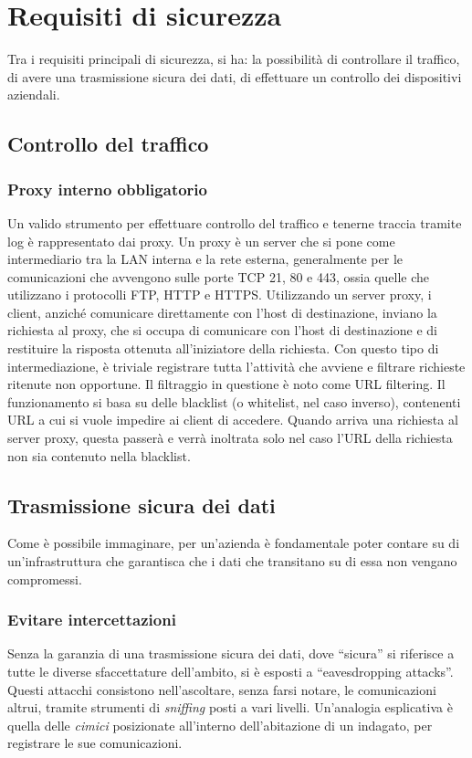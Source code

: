 \section{Requisiti di sicurezza}
Tra i requisiti principali di sicurezza, si ha: la possibilità di controllare il traffico, di avere una trasmissione sicura dei dati, di effettuare un controllo dei dispositivi aziendali.

\subsection{Controllo del traffico}
\subsubsection{Proxy interno obbligatorio}
Un valido strumento per effettuare controllo del traffico e tenerne traccia tramite log è rappresentato dai proxy.
Un proxy è un server che si pone come intermediario tra la LAN interna e la rete esterna, generalmente per le comunicazioni che avvengono sulle porte TCP 21, 80 e 443, ossia quelle che utilizzano i protocolli FTP, HTTP e HTTPS.
Utilizzando un server proxy, i client, anziché comunicare direttamente con l'host di destinazione, inviano la richiesta al proxy, che si occupa di comunicare con l'host di destinazione e di restituire la risposta ottenuta all'iniziatore della richiesta.
Con questo tipo di intermediazione, è triviale registrare tutta l'attività che avviene e filtrare richieste ritenute non opportune.
Il filtraggio in questione è noto come URL filtering. Il funzionamento si basa su delle blacklist (o whitelist, nel caso inverso), contenenti URL a cui si vuole impedire ai client di accedere. Quando arriva una richiesta al server proxy, questa passerà e verrà inoltrata solo nel caso l'URL della richiesta non sia contenuto nella blacklist.

\subsection{Trasmissione sicura dei dati}
Come è possibile immaginare, per un'azienda è fondamentale poter contare su di un'infrastruttura che garantisca che i dati che transitano su di essa non vengano compromessi.

\subsubsection{Evitare intercettazioni}
Senza la garanzia di una trasmissione sicura dei dati, dove ``sicura'' si riferisce a tutte le diverse sfaccettature dell'ambito, si è esposti a ``eavesdropping attacks''. Questi attacchi consistono nell'ascoltare, senza farsi notare, le comunicazioni altrui, tramite strumenti di \emph{sniffing} posti a vari livelli. Un'analogia esplicativa è quella delle \emph{cimici} posizionate all'interno dell'abitazione di un indagato, per registrare le sue comunicazioni.

